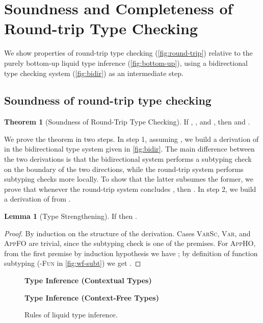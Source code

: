 \documentclass[10pt,preprint]{sigplanconf-pldi16}
\theoremstyle{definition}
\newtheorem{theorem}{Theorem}
\newtheorem{lemma}{Lemma}
\newif\iflong
\begin{document}



\iflong
\appendix
\section{Soundness and Completeness of Round-trip Type Checking}\label{app:proofs}


We show properties of round-trip type checking (\autoref{fig:round-trip})
relative to the purely bottom-up liquid type inference (\autoref{fig:bottom-up}),
using a bidirectional type checking system (\autoref{fig:bidir}) as an intermediate step.

\subsection{Soundness of round-trip type checking}

\addtocounter{theorem}{-2}

\begin{theorem}[Soundness of Round-Trip Type Checking]\label{thm:soundness}
If , , and , then  and .
\end{theorem}

We prove the theorem in two steps.
In step 1, assuming ,
we build a derivation of 
in the bidirectional type system given in \autoref{fig:bidir}.
The main difference between the two derivations is that 
the bidirectional system performs a subtyping check on the boundary of the two directions,
while the round-trip system performs subtyping checks more locally.
To show that the latter subsumes the former,
we prove that whenever the round-trip system concludes , 
then .
In step 2, we build a derivation of  from .

\begin{lemma}[Type Strengthening]\label{lemma:strengthen}
If  then .
\end{lemma}
\begin{proof}
By induction on the structure of the derivation. 
Cases \textsc{VarSc}, \textsc{Var}, and \textsc{AppFO} are trivial,
since the subtyping check is one of the premises.
For \textsc{AppHO}, from the first premise by induction hypothesis we have
;
by definition of function subtyping (\textsc{-Fun} in \autoref{fig:wf-subt})
we get .
\end{proof}

\begin{figure}
\small
\textbf{Type Inference (Contextual Types)}\quad


\textbf{Type Inference (Context-Free Types)}\quad

\caption{Rules of liquid type inference.}\label{fig:bottom-up}
\end{figure}
\end{document}
